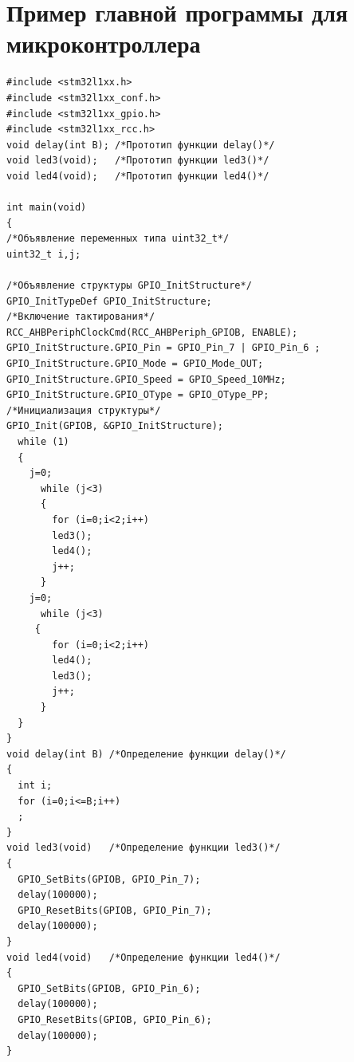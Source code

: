 \section{Пример главной программы для микроконтроллера}
\begin{verbatim}
#include <stm32l1xx.h>
#include <stm32l1xx_conf.h>
#include <stm32l1xx_gpio.h>
#include <stm32l1xx_rcc.h> 
void delay(int B); /*Прототип функции delay()*/
void led3(void);   /*Прототип функции led3()*/
void led4(void);   /*Прототип функции led4()*/

int main(void)
{
/*Объявление переменных типа uint32_t*/   
uint32_t i,j; 

/*Объявление структуры GPIO_InitStructure*/ 
GPIO_InitTypeDef GPIO_InitStructure; 
/*Включение тактирования*/
RCC_AHBPeriphClockCmd(RCC_AHBPeriph_GPIOB, ENABLE);   
GPIO_InitStructure.GPIO_Pin = GPIO_Pin_7 | GPIO_Pin_6 ;
GPIO_InitStructure.GPIO_Mode = GPIO_Mode_OUT;
GPIO_InitStructure.GPIO_Speed = GPIO_Speed_10MHz;
GPIO_InitStructure.GPIO_OType = GPIO_OType_PP;
/*Инициализация структуры*/        
GPIO_Init(GPIOB, &GPIO_InitStructure);  
  while (1)
  {
    j=0;
      while (j<3)
      {
        for (i=0;i<2;i++)
        led3();
        led4();
        j++;       
      }
    j=0;
      while (j<3)
     {
        for (i=0;i<2;i++)
        led4();
        led3();
        j++;       
      }         
  }
}
void delay(int B) /*Определение функции delay()*/
{
  int i;  
  for (i=0;i<=B;i++)
  ;
}
void led3(void)   /*Определение функции led3()*/
{
  GPIO_SetBits(GPIOB, GPIO_Pin_7);
  delay(100000);
  GPIO_ResetBits(GPIOB, GPIO_Pin_7);
  delay(100000);
}
void led4(void)   /*Определение функции led4()*/
{
  GPIO_SetBits(GPIOB, GPIO_Pin_6);
  delay(100000);
  GPIO_ResetBits(GPIOB, GPIO_Pin_6);
  delay(100000);
}
\end{verbatim}

